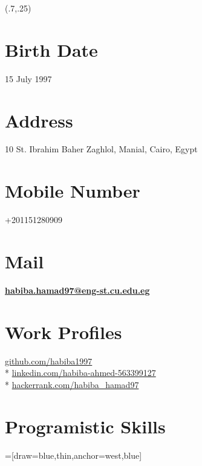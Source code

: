 \documentclass[hidelinks]{article}
\begin{document}
\begin{textblock}{3}(.7,.25)
\section*{Birth Date}
15 July 1997
\section*{Address}
10 St. Ibrahim Baher Zaghlol, Manial, Cairo, Egypt
\section*{Mobile Number}
+201151280909
\section*{Mail}
\href{mailto: habiba.hamad97@eng-st.cu.edu.eg
}{\textbf{habiba.hamad97@eng-st.cu.edu.eg}}
\section*{Work Profiles}
\href{https://github.com/habiba1997}{github.com/habiba1997} \\*
\href{https://www.linkedin.com/in/habiba-ahmed-563399127}{linkedin.com/habiba-ahmed-563399127} \\*
\href{https://www.hackerrank.com/habiba_hamad97}{hackerrank.com/habiba\_hamad97}
\section*{Programistic Skills}
    
=[draw=blue,thin,anchor=west,blue]

\end{textblock}
\end{document}
